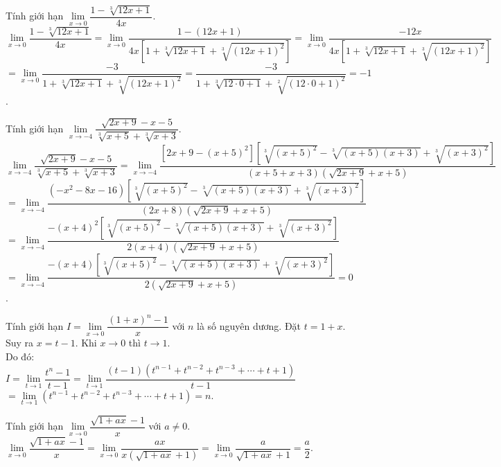\begin{vd}%
Tính giới hạn $\lim\limits_{x\to 0}\dfrac{1-\sqrt[3]{12x+1}}{4x}$.
\loigiai
{
$\lim\limits_{x\to 0}\dfrac{1-\sqrt[3]{12x+1}}{4x} = \lim\limits_{x\to 0}\dfrac{1-(12x+1)}{4x\left[1+\sqrt[3]{12x+1}+\sqrt[3]{(12x+1)^2}\right]} = \lim\limits_{x\to 0}\dfrac{-12x}{4x\left[1+\sqrt[3]{12x+1}+\sqrt[3]{(12x+1)^2}\right]}$\\
$= \lim\limits_{x\to 0}\dfrac{-3}{1+\sqrt[3]{12x+1} + \sqrt[3]{(12x+1)^2}} = \dfrac{-3}{1+\sqrt[3]{12 \cdot 0+1}+\sqrt[2]{(12 \cdot 0+1)^2}} = -1$.
}
\end{vd}


\begin{vd}%
Tính giới hạn $\lim\limits_{x\to -4}\dfrac{\sqrt{2x+9}-x-5}{\sqrt[3]{x+5}+\sqrt[3]{x+3}}$.
\loigiai
{
$\lim\limits_{x\to -4}\dfrac{\sqrt{2x+9}-x-5}{\sqrt[3]{x+5}+\sqrt[3]{x+3}} = \lim\limits_{x\to -4}\dfrac{\left[2x+9-(x+5)^2\right]\left[\sqrt[3]{(x+5)^2}-\sqrt[3]{(x+5)(x+3)}+\sqrt[3]{(x+3)^2}\right]}{(x+5+x+3)\left(\sqrt{2x+9}+x+5\right)}$\\
$= \lim\limits_{x\to -4}\dfrac{\left(-x^2-8x-16\right)\left[\sqrt[3]{(x+5)^2}-\sqrt[3]{(x+5)(x+3)}+\sqrt[3]{(x+3)^2}\right]}{(2x+8)\left(\sqrt{2x+9}+x+5\right)}$\\
$= \lim\limits_{x\to -4}\dfrac{-(x+4)^2\left[\sqrt[3]{(x+5)^2}-\sqrt[3]{(x+5)(x+3)}+\sqrt[3]{(x+3)^2}\right]}{2(x+4)\left(\sqrt{2x+9}+x+5\right)}$\\
$= \lim\limits_{x\to -4}\dfrac{-(x+4)\left[\sqrt[3]{(x+5)^2}-\sqrt[3]{(x+5)(x+3)}+\sqrt[3]{(x+3)^2}\right]}{2\left(\sqrt{2x+9}+x+5\right)}=0$.
}
\end{vd}


\begin{vd}%
Tính giới hạn $I = \lim\limits_{x \to 0} \dfrac{(1+x)^{n} - 1}{x}$ với $n$ là số nguyên dương.
\loigiai
{
Đặt $t = 1 + x$. Suy ra $x = t - 1$. Khi $x \to 0$ thì $t \to 1$.\\
Do đó:\\
$I = \lim\limits_{t \to 1} \dfrac{t^n - 1}{t - 1} = \lim\limits_{t \to 1} \dfrac{(t -1)\left(t^{n-1} + t^{n-2} + t^{n-3} + \cdots + t + 1\right)}{t - 1} $\\
$= \lim\limits_{t \to 1} \left(t^{n-1} + t^{n-2} + t^{n-3} + \cdots + t + 1\right) = n$.
}
\end{vd}


\begin{vd}%
Tính giới hạn $\lim\limits_{x \to 0} \dfrac{\sqrt{1 + ax} - 1}{x}$ với $a \neq 0$.
\loigiai
{
$\lim\limits_{x \to 0} \dfrac{\sqrt{1 + ax} - 1}{x} = \lim\limits_{x \to 0} \dfrac{ax}{x \left(\sqrt{1 + ax} + 1\right)} = \lim\limits_{x \to 0} \dfrac{a}{\sqrt{1 + ax} + 1} = \dfrac{a}{2}$.
}
\end{vd}


